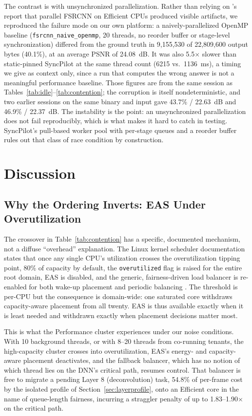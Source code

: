 \documentclass[conference]{IEEEtran}
\begin{document}
The contrast is with unsynchronized parallelization. Rather than relying on \cite{annisa2025fsrcnn}'s report that parallel FSRCNN on Efficient CPUs produced visible artifacts, we reproduced the failure mode on our own platform: a naively-parallelized OpenMP baseline (\texttt{fsrcnn\_naive\_openmp}, 20 threads, no reorder buffer or stage-level synchronization) differed from the ground truth in 9{,}155{,}530 of 22{,}809{,}600 output bytes (40.1\%), at an average PSNR of 24.08~dB. It was also 5.5$\times$ slower than static-pinned SyncPilot at the same thread count (6215 vs.\ 1136~ms), a timing we give as context only, since a run that computes the wrong answer is not a meaningful performance baseline. Those figures are from the same session as Tables~\ref{tab:idle}--\ref{tab:contention}; the corruption is itself nondeterministic, and two earlier sessions on the same binary and input gave 43.7\% / 22.63~dB and 46.9\% / 22.37~dB. The instability is the point: an unsynchronized parallelization does not fail reproducibly, which is what makes it hard to catch in testing. SyncPilot's pull-based worker pool with per-stage queues and a reorder buffer rules out that class of race condition by construction.

\section{Discussion}
\label{sec:discussion}

\subsection{Why the Ordering Inverts: EAS Under Overutilization}
\label{sec:noise}
The crossover in Table~\ref{tab:contention} has a specific, documented mechanism, not a diffuse ``overhead'' explanation. The Linux kernel scheduler documentation states that once any single CPU's utilization crosses the overutilization tipping point, 80\% of capacity by default, the \texttt{overutilized} flag is raised for the entire root domain, EAS is disabled, and the generic, fairness-driven load balancer is re-enabled for both wake-up placement and periodic balancing \cite{linuxeas}. The threshold is per-CPU but the consequence is domain-wide: one saturated core withdraws capacity-aware placement from all twenty. EAS is thus available exactly when it is least needed and withdrawn exactly when placement decisions matter most.

This is what the Performance cluster experiences under our noise conditions. With 10 background threads, or with 8--20 threads from co-running tenants, the high-capacity cluster crosses into overutilization, EAS's energy- and capacity-aware placement deactivates, and the fallback balancer, which has no notion of which thread lies on the DNN's critical path, resumes control. That balancer is free to migrate a pending Layer 8 (deconvolution) task, 54.8\% of per-frame cost by the isolated profile of Section~\ref{sec:layerprofile}, onto an Efficient core in the name of queue-length fairness, incurring a straggler penalty of up to 1.83--1.90$\times$ on the critical path.
\end{document}
